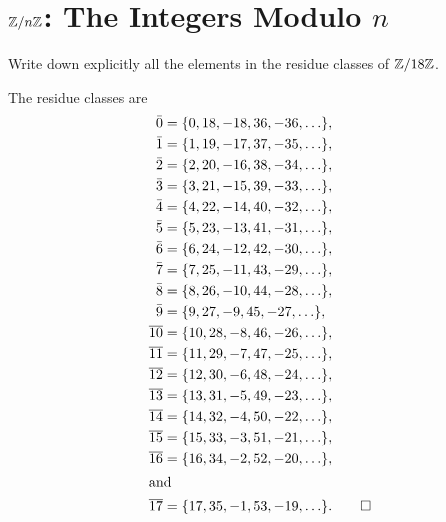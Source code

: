 \section{$\mathbb{Z}/n\mathbb{Z}$: The Integers Modulo $n$}

 Write down explicitly all the elements in the residue
classes of $\mathbb{Z}/18\mathbb{Z}$.
\begin{solution}
  The residue classes are
  \begin{align*}
    \bar{0} &= \{0, 18, -18, 36, -36, \ldots\}, \\
    \bar{1} &= \{1, 19, -17, 37, -35, \ldots\}, \\
    \bar{2} &= \{2, 20, -16, 38, -34, \ldots\}, \\
    \bar{3} &= \{3, 21, -15, 39, -33, \ldots\}, \\
    \bar{4} &= \{4, 22, -14, 40, -32, \ldots\}, \\
    \bar{5} &= \{5, 23, -13, 41, -31, \ldots\}, \\
    \bar{6} &= \{6, 24, -12, 42, -30, \ldots\}, \\
    \bar{7} &= \{7, 25, -11, 43, -29, \ldots\}, \\
    \bar{8} &= \{8, 26, -10, 44, -28, \ldots\}, \\
    \bar{9} &= \{9, 27, -9, 45, -27, \ldots\}, \\
    \overline{10} &= \{10, 28, -8, 46, -26, \ldots\}, \\
    \overline{11} &= \{11, 29, -7, 47, -25, \ldots\}, \\
    \overline{12} &= \{12, 30, -6, 48, -24, \ldots\}, \\
    \overline{13} &= \{13, 31, -5, 49, -23, \ldots\}, \\
    \overline{14} &= \{14, 32, -4, 50, -22, \ldots\}, \\
    \overline{15} &= \{15, 33, -3, 51, -21, \ldots\}, \\
    \overline{16} &= \{16, 34, -2, 52, -20, \ldots\}, \\
    \intertext{and}
    \overline{17} &= \{17, 35, -1, 53, -19, \ldots\}. \qedhere
  \end{align*}
\end{solution}

